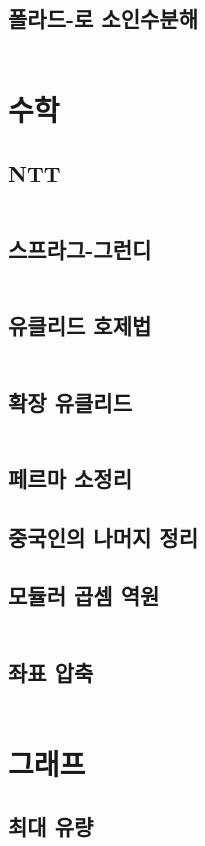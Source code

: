 \documentclass{article}
\begin{document}
\begin{multicols}{2}
\subsection{폴라드-로 소인수분해}
\inputminted{python}{codes/pollard-rho.py}

\section{수학}
\subsection{NTT}
\inputminted{python}{codes/ntt.py}
\subsection{스프라그-그런디}
\inputminted{python}{codes/nim.py}
\subsection{유클리드 호제법}
\inputminted{cpp}{codes/euclid.cpp}
\subsection{확장 유클리드}
\inputminted{python}{codes/eea.py}
\subsection{페르마 소정리}

\subsection{중국인의 나머지 정리}
\subsection{모듈러 곱셈 역원}
\inputminted{python}{codes/modular.py}
\subsection{좌표 압축}
\inputminted{python}{codes/comp.py}

\section{그래프}
\subsection{최대 유량}
\inputminted{python}{codes/mf.py}

\end{multicols}
\end{document}
